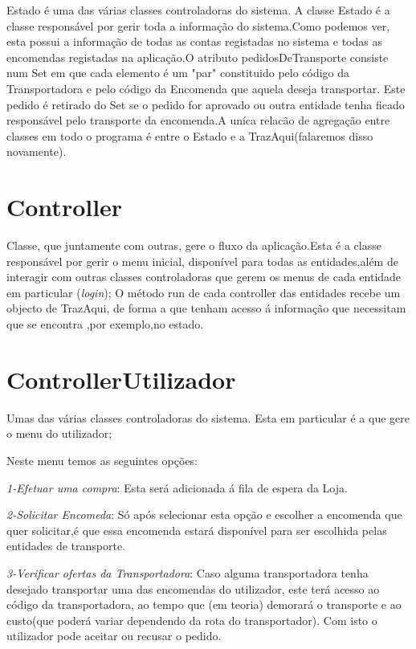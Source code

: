 \documentclass[a4paper]{report}
\begin{document}
	Estado é uma das várias classes controladoras do sistema.
	A classe Estado é a classe responsável por gerir toda a informação do sistema.Como podemos ver, esta possui a informação de todas as contas registadas no sistema e todas as encomendas registadas na aplicação.O atributo pedidosDeTransporte consiste num Set em que cada elemento é um "par" constituido pelo código da Transportadora e pelo código da Encomenda que aquela deseja transportar. Este pedido é retirado do Set se o pedido for aprovado ou outra entidade tenha ficado responsável pelo transporte da encomenda.A uníca relacão de agregação entre classes em todo o programa é entre o Estado e a TrazAqui(falaremos disso novamente).
	
	\section{Controller}
	Classe, que juntamente com outras, gere o fluxo da aplicação.Esta é a classe responsável por gerir o menu inicial, disponível para todas as entidades,além de interagir com outras classes controladoras que gerem os menus de cada entidade em particular (\textit{login});
	O método run de cada controller das entidades recebe um objecto de TrazAqui, de forma a que tenham acesso á informação que necessitam que se encontra ,por exemplo,no estado.


    \section{ControllerUtilizador}
    Umas das várias classes controladoras do sistema. Esta em particular é a que gere o menu do utilizador; 
    
      Neste menu temos as seguintes opções:
      
      \textit{1-Efetuar uma compra}: Esta será adicionada á fila de espera da Loja.
      
      \textit{2-Solicitar Encomeda}: Só após selecionar esta opção e escolher a encomenda que quer solicitar,é que essa encomenda estará disponível para ser escolhida pelas entidades de transporte.
      
      \textit{3-Verificar ofertas da Transportadora}: Caso alguma transportadora tenha desejado transportar uma das encomendas do  utilizador, este terá acesso ao código da transportadora, ao tempo que (em teoria) demorará o transporte e ao custo(que poderá variar dependendo da rota do transportador). Com isto o utilizador pode aceitar ou recusar o pedido.
      
\end{document}
